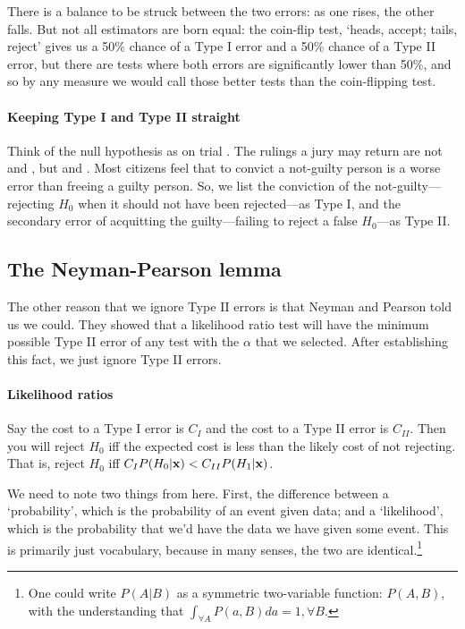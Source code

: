 There
is a balance to be struck between the two errors: as one rises, the
other falls. But not all estimators are born equal: the coin-flip test, `heads, accept;
tails, reject' gives us a 50\% chance of a Type I error
and a 50\% chance of a Type II error, but there are tests where both
errors are significantly lower than 50\%, and so by any measure we would
call those better tests than the coin-flipping test. 

\paragraph{Keeping Type I and Type II straight} 
 

Think of the null hypothesis as on
trial \citep[pp 112--113]{kmenta}.  The rulings a jury may return are
not  and , but  and . Most citizens feel that to convict a not-guilty person is a worse
error than freeing a guilty person. So, we list the conviction of the
not-guilty---rejecting $H_0$ when it should not have been rejected---as
Type I, and the secondary error of acquitting the guilty---failing to
reject a false $H_0$---as Type II.


\subsection{The Neyman-Pearson lemma}  
The other reason that we ignore Type II errors is that Neyman and Pearson
told us we could.  They showed that a likelihood ratio test will have
the minimum possible Type II error of any test with the $\alpha$ that
we selected. After establishing this fact, we just ignore Type II errors.

\paragraph{Likelihood ratios} 

Say the cost to a Type I error is $C_I$ and the cost to a Type II error
is $C_{II}$.  Then you will reject $H_0$ iff the expected cost is less
than the likely cost of not rejecting. That is, reject $H_0$ iff $C_I
P(H_0|{\bf x})<C_{II} P(H_1|{\bf x})$.

We need to note two things from here. First, the difference between a
`probability', which is the probability of an event given data; and a
`likelihood', which is the probability that we'd have the data we have
given some event. This is primarily just vocabulary, because in many
senses, the two are identical.\footnote{One could write $P(A|B)$ as a symmetric two-variable function:
$P(A,B)$, with the understanding that $\int_{\forall A} P(a,B)da = 1,
\forall B$.} 

